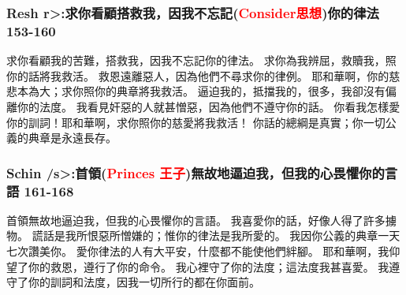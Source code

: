 \subsubsection{Resh  \<r>:求你看顧搭救我，因我不忘記(\textcolor{red}{Consider思想})你的律法  153-160}
求你看顧我的苦難，搭救我，因我不忘記你的律法。
求你為我辨屈，救贖我，照你的話將我救活。
救恩遠離惡人，因為他們不尋求你的律例。
耶和華啊，你的慈悲本為大；求你照你的典章將我救活。
逼迫我的，抵擋我的，很多，我卻沒有偏離你的法度。
我看見奸惡的人就甚憎惡，因為他們不遵守你的話。
你看我怎樣愛你的訓詞！耶和華啊，求你照你的慈愛將我救活！
你話的總綱是真實；你一切公義的典章是永遠長存。


\subsubsection{Schin  \</s>:首領(\textcolor{red}{Princes 王子})無故地逼迫我，但我的心畏懼你的言語  161-168}
首領無故地逼迫我，但我的心畏懼你的言語。
我喜愛你的話，好像人得了許多擄物。
謊話是我所恨惡所憎嫌的；惟你的律法是我所愛的。
我因你公義的典章一天七次讚美你。
愛你律法的人有大平安，什麼都不能使他們絆腳。
耶和華啊，我仰望了你的救恩，遵行了你的命令。
我心裡守了你的法度；這法度我甚喜愛。
我遵守了你的訓詞和法度，因我一切所行的都在你面前。


